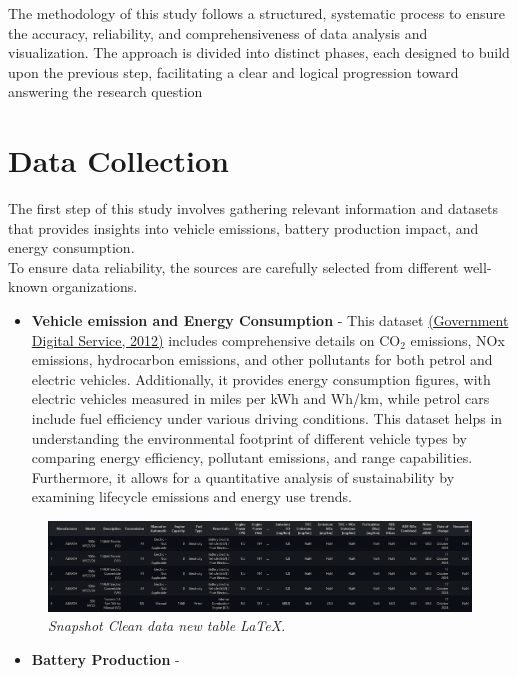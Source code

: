 The methodology of this study follows a structured, systematic process to ensure the accuracy, reliability, and comprehensiveness of data analysis and visualization. The approach is divided into distinct phases, each designed to build upon the previous step, facilitating a clear and logical progression toward answering the research question
\clearpage

\section{Data Collection}
 The first step of this study involves gathering relevant information and datasets that provides insights into vehicle emissions, battery production impact, and energy consumption. \\ To ensure data reliability, the sources are carefully selected from different well-known organizations. 
 \begin{itemize}
     \item \textbf{Vehicle emission and Energy Consumption} - This dataset \href{https://www.gov.uk/co2-and-vehicle-tax-tools}{(Government Digital Service, 2012)} includes comprehensive details on CO$_2$ emissions, NOx emissions, hydrocarbon emissions, and other pollutants for both petrol and electric vehicles. Additionally, it provides energy consumption figures, with electric vehicles measured in miles per kWh and Wh/km, while petrol cars include fuel efficiency under various driving conditions. This dataset helps in understanding the environmental footprint of different vehicle types by comparing energy efficiency, pollutant emissions, and range capabilities. Furthermore, it allows for a quantitative analysis of sustainability by examining lifecycle emissions and energy use trends.
 \end{itemize}

 \begin{figure}[H]
    \centering
    \includegraphics[scale=0.38]{figures/Vehicle Emissions.png}
    \caption{\textit{Snapshot Clean data new table \LaTeX}.}
    \label{fig:chart_1}
\end{figure}
\begin{itemize}
    \item \textbf{Battery Production} - 
\end{itemize}
 


